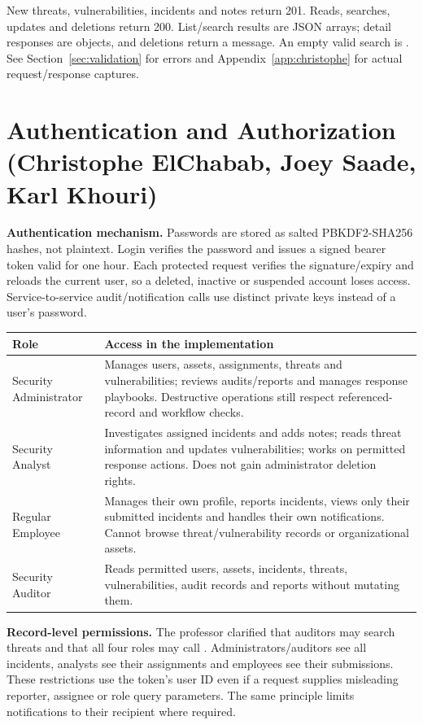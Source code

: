 \documentclass[11pt,a4paper]{article}
\begin{document}
New threats, vulnerabilities, incidents and notes return 201. Reads, searches, updates and deletions return 200. List/search results are JSON arrays; detail responses are objects, and deletions return a message. An empty valid search is \code{[]}. See Section~\ref{sec:validation} for errors and Appendix~\ref{app:christophe} for actual request/response captures.




\section{Authentication and Authorization (Christophe ElChabab, Joey Saade, Karl Khouri)}
\label{sec:authorization}
\textbf{Authentication mechanism.} Passwords are stored as salted PBKDF2-SHA256 hashes, not plaintext. Login verifies the password and issues a signed bearer token valid for one hour. Each protected request verifies the signature/expiry and reloads the current user, so a deleted, inactive or suspended account loses access. Service-to-service audit/notification calls use distinct private keys instead of a user's password.

\begin{small}\begin{tabularx}{\linewidth}{@{}p{34mm}X@{}}
\toprule\textbf{Role} & \textbf{Access in the implementation}\\\midrule
Security Administrator & Manages users, assets, assignments, threats and vulnerabilities; reviews audits/reports and manages response playbooks. Destructive operations still respect referenced-record and workflow checks.\\
Security Analyst & Investigates assigned incidents and adds notes; reads threat information and updates vulnerabilities; works on permitted response actions. Does not gain administrator deletion rights.\\
Regular Employee & Manages their own profile, reports incidents, views only their submitted incidents and handles their own notifications. Cannot browse threat/vulnerability records or organizational assets.\\
Security Auditor & Reads permitted users, assets, incidents, threats, vulnerabilities, audit records and reports without mutating them.\\\bottomrule
\end{tabularx}\end{small}

\textbf{Record-level permissions.} The professor clarified that auditors may search threats and that all four roles may call . Administrators/auditors see all incidents, analysts see their assignments and employees see their submissions. These restrictions use the token's user ID even if a request supplies misleading reporter, assignee or role query parameters. The same principle limits notifications to their recipient where required.
\end{document}
